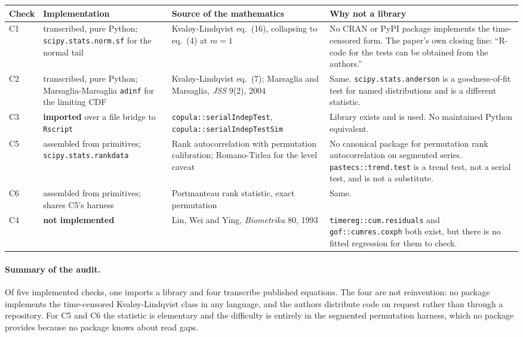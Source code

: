 \documentclass[11pt,a4paper]{article}
\begin{document}
\begin{center}
\small
\begin{tabular}{@{}p{}p{}p{}p{}@{}}
\toprule
\textbf{Check} & \textbf{Implementation} & \textbf{Source of the mathematics} &
\textbf{Why not a library}\\
\midrule
C1 & transcribed, pure Python; \texttt{scipy.stats.norm.sf} for the normal tail &
Kvaløy-Lindqvist eq.~(16), collapsing to eq.~(4) at $m=1$ &
No CRAN or PyPI package implements the time-censored form. The paper's own closing line:
\enquote{R-code for the tests can be obtained from the authors.}\\[3pt]
C2 & transcribed, pure Python; Marsaglia-Marsaglia \texttt{adinf} for the limiting CDF &
Kvaløy-Lindqvist eq.~(7); Marsaglia and Marsaglia, \emph{JSS} 9(2), 2004 &
Same. \texttt{scipy.stats.anderson} is a goodness-of-fit test for named distributions and
is a different statistic.\\[3pt]
C3 & \textbf{imported} over a file bridge to \texttt{Rscript} &
\texttt{copula::serialIndepTest}, \texttt{copula::serialIndepTestSim} &
Library exists and is used. No maintained Python equivalent.\\[3pt]
C5 & assembled from primitives; \texttt{scipy.stats.rankdata} &
Rank autocorrelation with permutation calibration; Romano-Tirlea for the level caveat &
No canonical package for permutation rank autocorrelation on segmented series.
\texttt{pastecs::trend.test} is a trend test, not a serial test, and is not a
substitute.\\[3pt]
C6 & assembled from primitives; shares C5's harness &
Portmanteau rank statistic, exact permutation &
Same.\\[3pt]
C4 & \textbf{not implemented} &
Lin, Wei and Ying, \emph{Biometrika} 80, 1993 &
\texttt{timereg::cum.residuals} and \texttt{gof::cumres.coxph} both exist, but there is
no fitted regression for them to check.\\
\bottomrule
\end{tabular}
\end{center}

\paragraph{Summary of the audit.} Of five implemented checks, one imports a library and
four transcribe published equations. The four are not reinvention: no package implements
the time-censored Kvaløy-Lindqvist class in any language, and the authors distribute code
on request rather than through a repository. For C5 and C6 the statistic is elementary and
the difficulty is entirely in the segmented permutation harness, which no package
provides because no package knows about read gaps.
\end{document}
